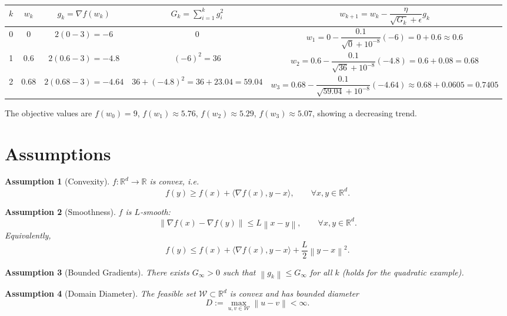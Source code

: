 \documentclass{article}
\newtheorem{assumption}{Assumption}
\newcommand{\RR}{\mathbb{R}}
\newcommand{\norm}[1]{\left\|#1\right\|}
\newcommand{\inner}[2]{\langle #1,#2\rangle}
\begin{document}
\begin{center}
\begin{tabular}{c|c|c|c|c}
$k$ & $w_{k}$ & $g_{k}= \nabla f(w_{k})$ & $G_{k}= \sum_{i=1}^{k}g_{i}^{2}$ & $w_{k+1}=w_{k}-\dfrac{\eta}{\sqrt{G_{k}}+\epsilon}g_{k}$ \\ \hline
0 & $0$ & $2(0-3)=-6$ & $0$ & $w_{1}=0-\dfrac{0.1}{\sqrt{0}+10^{-8}}(-6)=0+0.6\approx0.6$ \\
1 & $0.6$ & $2(0.6-3)=-4.8$ & $(-6)^{2}=36$ & $w_{2}=0.6-\dfrac{0.1}{\sqrt{36}+10^{-8}}(-4.8)=0.6+0.08=0.68$ \\
2 & $0.68$ & $2(0.68-3)=-4.64$ & $36+(-4.8)^{2}=36+23.04=59.04$ & $w_{3}=0.68-\dfrac{0.1}{\sqrt{59.04}+10^{-8}}(-4.64)
\approx0.68+0.0605=0.7405$
\end{tabular}
\end{center}
The objective values are $f(w_{0})=9$, $f(w_{1})\approx5.76$, $f(w_{2})\approx5.29$, $f(w_{3})\approx5.07$, showing a decreasing trend.

\newpage

\section*{Assumptions}
\begin{assumption}[Convexity]\label{as:convex}
$f:\RR^{d}\rightarrow\RR$ is convex, i.e.
\[
f(y)\ge f(x)+\inner{\nabla f(x)}{y-x},\qquad\forall x,y\in\RR^{d}.
\]
\end{assumption}
\begin{assumption}[Smoothness]\label{as:smooth}
$f$ is $L$‑smooth:
\[
\norm{\nabla f(x)-\nabla f(y)}\le L\norm{x-y},\qquad\forall x,y\in\RR^{d}.
\]
Equivalently,
\[
f(y)\le f(x)+\inner{\nabla f(x)}{y-x}+\frac{L}{2}\norm{y-x}^{2}.
\]
\end{assumption}
\begin{assumption}[Bounded Gradients]\label{as:bound}
There exists $G_{\infty}>0$ such that $\norm{g_{k}}\le G_{\infty}$ for all $k$ (holds for the quadratic example).
\end{assumption}
\begin{assumption}[Domain Diameter]\label{as:diam}
The feasible set $\mathcal{W}\subset\RR^{d}$ is convex and has bounded diameter 
\[
D:=\max_{u,v\in\mathcal{W}}\norm{u-v}<\infty .
\]
\end{assumption}
\end{document}
